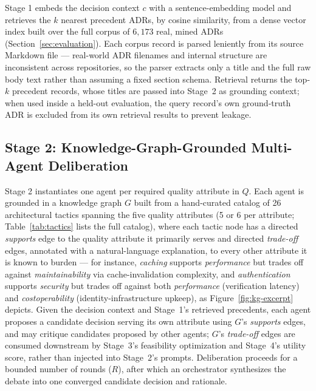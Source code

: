 \documentclass[preprint,12pt,authoryear]{elsarticle}
\renewcommand{\_}{\textunderscore\allowbreak{}}
\begin{document}
Stage 1 embeds the decision context $c$ with a sentence-embedding model and retrieves the $k$ nearest precedent ADRs, by cosine similarity, from a dense vector index built over the full corpus of $6{,}173$ real, mined ADRs (Section~\ref{sec:evaluation}). Each corpus record is parsed leniently from its source Markdown file --- real-world ADR filenames and internal structure are inconsistent across repositories, so the parser extracts only a title and the full raw body text rather than assuming a fixed section schema. Retrieval returns the top-$k$ precedent records, whose titles are passed into Stage~2 as grounding context; when used inside a held-out evaluation, the query record's own ground-truth ADR is excluded from its own retrieval results to prevent leakage.

\subsection{Stage 2: Knowledge-Graph-Grounded Multi-Agent Deliberation}

Stage 2 instantiates one agent per required quality attribute in $Q$. Each agent is grounded in a knowledge graph $G$ built from a hand-curated catalog of 26 architectural tactics spanning the five quality attributes (5 or 6 per attribute; Table~\ref{tab:tactics} lists the full catalog), where each tactic node has a directed \emph{supports} edge to the quality attribute it primarily serves and directed \emph{trade-off} edges, annotated with a natural-language explanation, to every other attribute it is known to burden --- for instance, \emph{caching} supports \emph{performance} but trades off against \emph{maintainability} via cache-invalidation complexity, and \emph{authentication} supports \emph{security} but trades off against both \emph{performance} (verification latency) and \emph{cost\_operability} (identity-infrastructure upkeep), as Figure~\ref{fig:kg-excerpt} depicts. Given the decision context and Stage~1's retrieved precedents, each agent proposes a candidate decision serving its own attribute using $G$'s \emph{supports} edges, and may critique candidates proposed by other agents; $G$'s \emph{trade-off} edges are consumed downstream by Stage~3's feasibility optimization and Stage~4's utility score, rather than injected into Stage~2's prompts. Deliberation proceeds for a bounded number of rounds ($R$), after which an orchestrator synthesizes the debate into one converged candidate decision and rationale.
\end{document}
